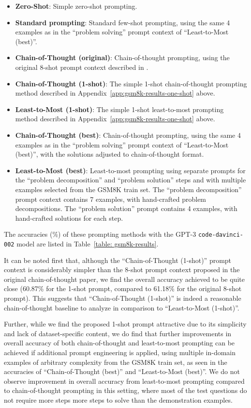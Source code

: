 \begin{itemize}
\item \textbf{Zero-Shot}: Simple zero-shot prompting.
\item \textbf{Standard prompting}: Standard few-shot prompting, using the same 4 examples as in the ``problem solving'' prompt context of ``Least-to-Most (best)''.
\item \textbf{Chain-of-Thought (original)}: Chain-of-thought prompting, using the original 8-shot prompt context described in \citet{wei2022chain}.
\item \textbf{Chain-of-Thought (1-shot)}: The simple 1-shot chain-of-thought prompting method described in Appendix~\ref{app:gsm8k-results-one-shot} above.
\item \textbf{Least-to-Most (1-shot)}: The simple 1-shot least-to-most prompting method described in Appendix~\ref{app:gsm8k-results-one-shot} above.
\item \textbf{Chain-of-Thought (best)}: Chain-of-thought prompting, using the same 4 examples as in the ``problem solving'' prompt context of ``Least-to-Most (best)'', with the solutions adjusted to chain-of-thought format.
\item \textbf{Least-to-Most (best)}: Least-to-most prompting using separate prompts for the ``problem decomposition'' and ``problem solution'' steps and with multiple examples selected from the GSM8K train set. The ``problem decomposition'' prompt context contains 7 examples, with hand-crafted problem decompositions. The ``problem solution'' prompt contains 4 examples, with hand-crafted solutions for each step.
\end{itemize}

The accuracies (\%) of these prompting methods with the GPT-3 \texttt{code-davinci-002} model are listed in Table~\ref{table: gsm8k-results}.

It can be noted first that, although the ``Chain-of-Thought (1-shot)'' prompt context is considerably simpler than the 8-shot prompt context proposed in the original chain-of-thought paper, we find the overall accuracy achieved to be quite close (60.87\% for the 1-shot prompt, compared to 61.18\% for the original 8-shot prompt). This suggests that ``Chain-of-Thought (1-shot)'' is indeed a reasonable chain-of-thought baseline to analyze in comparison to ``Least-to-Most (1-shot)''.

Further, while we find the proposed 1-shot prompt attractive due to its simplicity and lack of dataset-specific content, we do find that further improvements in overall accuracy of both chain-of-thought and least-to-most prompting can be achieved if additional prompt engineering is applied, using multiple in-domain examples of arbitrary complexity from the GSM8K train set, as seen in the accuracies of ``Chain-of-Thought (best)'' and ``Least-to-Most (best)''. We do not observe improvement in overall accuracy from least-to-most prompting compared to chain-of-thought prompting in this setting, where most of the test questions do not require more steps more steps to solve than the demonstration examples.

